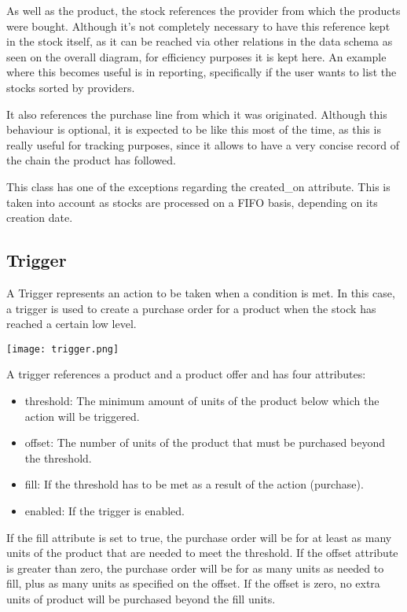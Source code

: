 As well as the product, the stock references the provider from which the products were bought. Although it’s not completely necessary to have this reference kept in the stock itself, as it can be reached via other relations in the data schema as seen on the overall diagram, for efficiency purposes it is kept here. An example where this becomes useful is in reporting, specifically if the user wants to list the stocks sorted by providers.

It also references the purchase line from which it was originated. Although this behaviour is optional, it is expected to be like this most of the time, as this is really useful for tracking purposes, since it allows to have a very concise record of the chain the product has followed.

This class has one of the exceptions regarding the created\_on attribute. This is taken into account as stocks are processed on a FIFO basis, depending on its creation date.

\subsection{Trigger}
A Trigger represents an action to be taken when a condition is met. In this case, a trigger is used to create a purchase order for a product when the stock has reached a certain low level.

\begin{center}
\texttt{[image: trigger.png]}
\end{center}
A trigger references a product and a product offer and has four attributes:

\begin{itemize}
\item threshold: The minimum amount of units of the product below which the action will be triggered.
\item offset: The number of units of the product that must be purchased beyond the threshold.
\item fill: If the threshold has to be met as a result of the action (purchase).
\item enabled: If the trigger is enabled.
\end{itemize}

If the fill attribute is set to true, the purchase order will be for at least as many units of the product that are needed to meet the threshold. If the offset attribute is greater than zero, the purchase order will be for as many units as needed to fill, plus as many units as specified on the offset. If the offset is zero, no extra units of product will be purchased beyond the fill units.


